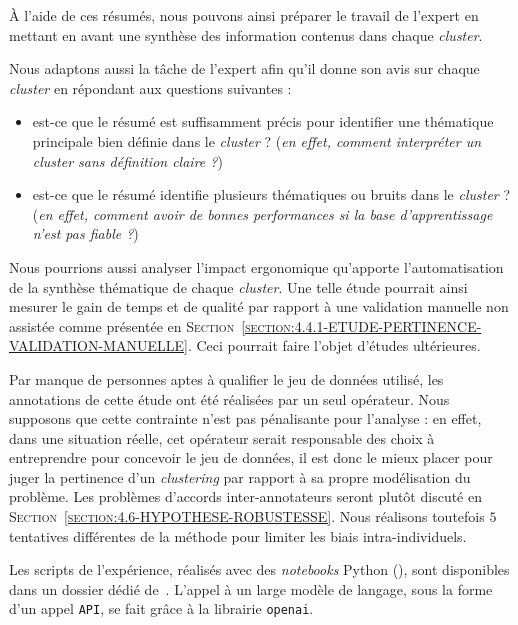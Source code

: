 			À l'aide de ces résumés, nous pouvons ainsi préparer le travail de l'expert en mettant en avant une synthèse des information contenus dans chaque \textit{cluster}.
			
			Nous adaptons aussi la tâche de l'expert afin qu'il donne son avis sur chaque \textit{cluster} en répondant aux questions suivantes :
			\begin{itemize}
				\item est-ce que le résumé est suffisamment précis pour identifier une thématique principale bien définie dans le \textit{cluster} ? (\textit{en effet, comment interpréter un cluster sans définition claire ?})
				\item est-ce que le résumé identifie plusieurs thématiques ou bruits dans le \textit{cluster} ? (\textit{en effet, comment avoir de bonnes performances si la base d'apprentissage n'est pas fiable ?})
			\end{itemize}
			
			\begin{leftBarIdea}
				Nous pourrions aussi analyser l'impact ergonomique qu'apporte l'automatisation de la synthèse thématique de chaque \textit{cluster}.
				Une telle étude pourrait ainsi mesurer le gain de temps et de qualité par rapport à une validation manuelle non assistée comme présentée en \textsc{Section~\ref{section:4.4.1-ETUDE-PERTINENCE-VALIDATION-MANUELLE}}.
				Ceci pourrait faire l'objet d'études ultérieures.
			\end{leftBarIdea}
			
			\begin{leftBarWarning}
				Par manque de personnes aptes à qualifier le jeu de données utilisé, les annotations de cette étude ont été réalisées par un seul opérateur.
				Nous supposons que cette contrainte n'est pas pénalisante pour l'analyse : en effet, dans une situation réelle, cet opérateur serait responsable des choix à entreprendre pour concevoir le jeu de données, il est donc le mieux placer pour juger la pertinence d'un \textit{clustering} par rapport à sa propre modélisation du problème.
				Les problèmes d'accords inter-annotateurs seront plutôt discuté en \textsc{Section~\ref{section:4.6-HYPOTHESE-ROBUSTESSE}}.
				Nous réalisons toutefois $5$ tentatives différentes de la méthode pour limiter les biais intra-individuels.
			\end{leftBarWarning}
			
			\begin{leftBarInformation}
				Les scripts de l'expérience, réalisés avec des \textit{notebooks} Python (\cite{van-rossum-drake:2009:python-reference-manual}), sont disponibles dans un dossier dédié de~\cite{schild:2021:cognitivefactory-interactiveclusteringcomparativestudy}.
				L'appel à un large modèle de langage, sous la forme d'un appel \texttt{API}, se fait grâce à la librairie \texttt{openai}.
			\end{leftBarInformation}

